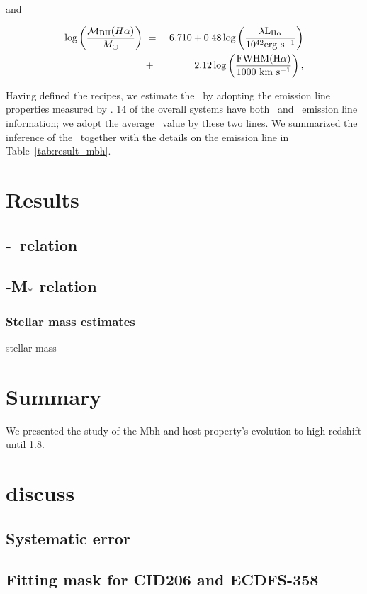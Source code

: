 \documentclass[apj]{emulateapj}
\begin{document}
and

\begin{eqnarray}
\label{eq:Ha}
\log \left(\frac{\mathcal M_{\rm BH} (H\alpha)}{M_{\odot}}\right)&~=~& 6.710+0.48 \log \left(\frac{ \lambda \rm L _{H\alpha}}{10^{42}{\rm erg~s^{-1}}}\right) \nonumber\\
&~+~& 2.12 \log \left(\frac{\rm FWHM(H\alpha)}{1000 ~{\rm km~s^{-1}}}\right) , 
\end {eqnarray}

Having defined the recipes, we estimate the \mbh\ by adopting the emission line properties measured by \citet{Schulze2018}. 14 of the overall systems have both \halpha\ and \hbeta\ emission line information; we adopt the average \mbh\ value by these two lines. We summarized the inference of the \mbh\ together with the details on the emission line in Table~\ref{tab:result_mbh}.


\section{Results}
\label{sec:result}
\subsection{\mbh-\lhost\ relation}

\subsection{\mbh-M$_*$ relation}
\subsubsection{Stellar mass estimates}
stellar mass \\

\section{Summary}
\label{sec:sum}
We presented the study of the Mbh and host property's evolution to high redshift until 1.8.

\section{discuss}
\label{sec:dis}
\subsection{Systematic error}
\subsection{Fitting mask for CID206 and ECDFS-358}
\end{document}
